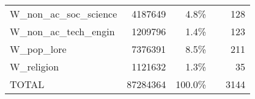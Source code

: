{\begin{center}
\begin{tabular}{lrrcr}
        W\_non\_ac\_soc\_science           & 4187649  & 4.8\%   &                                                         & 128   \\
        W\_non\_ac\_tech\_engin            & 1209796  & 1.4\%   &                                                         & 123   \\ \cline{4-4}
        W\_pop\_lore                       & 7376391  & 8.5\%   &                                                         & 211   \\
        W\_religion                        & 1121632  & 1.3\%   &                                                         & 35    \\ \hline
        TOTAL                              & 87284364 & 100.0\% &                                                         & 3144  \\ \hline
    \end{tabular}
    \end{center}
}
